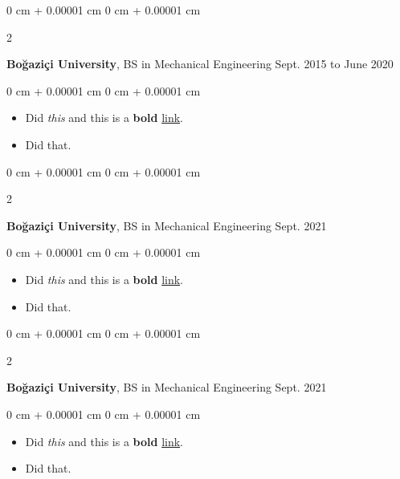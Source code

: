 \documentclass[10pt, letterpaper]{article}
\newenvironment{highlights}{
    \begin{itemize}[
        topsep=0.10 cm,
        parsep=0.10 cm,
        partopsep=0pt,
        itemsep=0pt,
        leftmargin=0 cm + 10pt
    ]
}{
    \end{itemize}
} %
\newenvironment{onecolentry}{
    \begin{adjustwidth}{
        0 cm + 0.00001 cm
    }{
        0 cm + 0.00001 cm
    }
}{
    \end{adjustwidth}
} %
\newenvironment{twocolentry}[2][]{
    \onecolentry
    \def\secondColumn{#2}
    \setcolumnwidth{\fill, 4.5 cm}
    \begin{paracol}{2}
}{
    \switchcolumn \raggedleft \secondColumn
    \end{paracol}
    \endonecolentry
} %
\begin{document}
        \vspace{0.2 cm}

        \begin{twocolentry}{
            Sept. 2015 to June 2020
        }
            \textbf{Boğaziçi University}, BS in Mechanical Engineering\end{twocolentry}

        \vspace{0.10 cm}
        \begin{onecolentry}
            \begin{highlights}
                \item Did \textit{this} and this is a \textbf{bold} \href{https://example.com}{link}.
                \item Did that.
            \end{highlights}
        \end{onecolentry}


        \vspace{0.2 cm}

        \begin{twocolentry}{
            Sept. 2021
        }
            \textbf{Boğaziçi University}, BS in Mechanical Engineering\end{twocolentry}

        \vspace{0.10 cm}
        \begin{onecolentry}
            \begin{highlights}
                \item Did \textit{this} and this is a \textbf{bold} \href{https://example.com}{link}.
                \item Did that.
            \end{highlights}
        \end{onecolentry}


        \vspace{0.2 cm}

        \begin{twocolentry}{
            Sept. 2021
        }
            \textbf{Boğaziçi University}, BS in Mechanical Engineering\end{twocolentry}

        \vspace{0.10 cm}
        \begin{onecolentry}
            \begin{highlights}
                \item Did \textit{this} and this is a \textbf{bold} \href{https://example.com}{link}.
                \item Did that.
            \end{highlights}
        \end{onecolentry}
\end{document}
